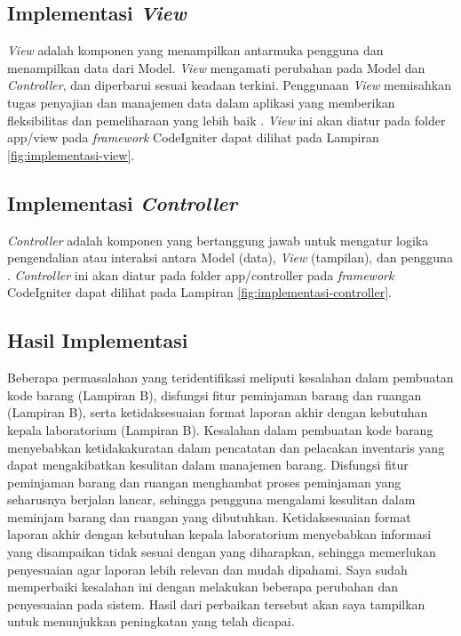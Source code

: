 \subsection{Implementasi \textit{View}}
\textit{View }adalah komponen yang menampilkan antarmuka pengguna dan menampilkan data dari Model. \textit{View} mengamati perubahan pada Model dan \textit{Controller}, dan diperbarui sesuai keadaan terkini. Penggunaan \textit{View} memisahkan tugas penyajian dan manajemen data dalam aplikasi yang memberikan fleksibilitas dan pemeliharaan yang lebih baik \cite{firdaus2020rancang}. \textit{View} ini akan diatur pada folder app/view pada \textit{framework} CodeIgniter dapat dilihat pada Lampiran \ref{fig:implementasi-view}.

\subsection{Implementasi \textit{Controller}}
\textit{Controller} adalah komponen yang bertanggung jawab untuk mengatur logika pengendalian atau interaksi antara Model (data), \textit{View} (tampilan), dan pengguna \cite{rahman2018perancangan}. \textit{Controller} ini akan diatur pada folder app/controller pada \textit{framework} CodeIgniter dapat dilihat pada Lampiran \ref{fig:implementasi-controller}.

\subsection{Hasil Implementasi}
Beberapa permasalahan yang teridentifikasi meliputi kesalahan dalam pembuatan kode barang (Lampiran B), disfungsi fitur peminjaman barang dan ruangan (Lampiran B), serta ketidaksesuaian format laporan akhir dengan kebutuhan kepala laboratorium (Lampiran B). Kesalahan dalam pembuatan kode barang menyebabkan ketidakakuratan dalam pencatatan dan pelacakan inventaris yang dapat mengakibatkan kesulitan dalam manajemen barang. Disfungsi fitur peminjaman barang dan ruangan menghambat proses peminjaman yang seharusnya berjalan lancar, sehingga pengguna mengalami kesulitan dalam meminjam barang dan ruangan yang dibutuhkan. Ketidaksesuaian format laporan akhir dengan kebutuhan kepala laboratorium menyebabkan informasi yang disampaikan tidak sesuai dengan yang diharapkan, sehingga memerlukan penyesuaian agar laporan lebih relevan dan mudah dipahami. Saya sudah memperbaiki kesalahan ini dengan melakukan beberapa perubahan dan penyesuaian pada sistem. Hasil dari perbaikan tersebut akan saya tampilkan untuk menunjukkan peningkatan yang telah dicapai.

